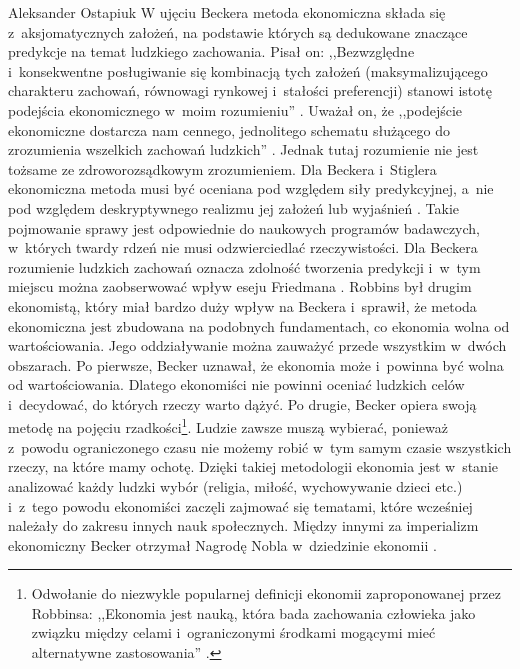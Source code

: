 \begin{artplenv}{Aleksander Ostapiuk}
W ujęciu Beckera metoda ekonomiczna składa się z~aksjomatycznych założeń, na podstawie których są dedukowane znaczące
predykcje na temat ludzkiego zachowania. Pisał on: ,,Bezwzględne i~konsekwentne posługiwanie się kombinacją tych założeń
(maksymalizującego charakteru zachowań, równowagi rynkowej i~stałości preferencji) stanowi istotę podejścia
ekonomicznego w~moim rozumieniu''
\parencite[s.~23]{becker_ekonomiczna_1990}.
Uważał on, że ,,podejście ekonomiczne
dostarcza nam cennego, jednolitego schematu służącego do zrozumienia wszelkich zachowań ludzkich''
\parencite[s.~38]{becker_ekonomiczna_1990}.
Jednak tutaj rozumienie nie jest tożsame ze zdroworozsądkowym
zrozumieniem. Dla Beckera i~Stiglera
\parencite*{becker_gustibus_1977}
ekonomiczna metoda musi być oceniana pod względem
siły predykcyjnej, a~nie pod względem deskryptywnego realizmu jej założeń lub wyjaśnień
\parencite[s.~402–403]{becker_economic_1993}.
Takie pojmowanie sprawy jest odpowiednie do naukowych programów
badawczych, w~których twardy rdzeń nie musi odzwierciedlać rzeczywistości. Dla Beckera rozumienie ludzkich zachowań
oznacza zdolność tworzenia predykcji i~w~tym miejscu można zaobserwować wpływ eseju Friedmana
\parencite*{friedman_essays_1953}.
Robbins był drugim ekonomistą, który miał bardzo duży wpływ na Beckera i~sprawił, że
metoda ekonomiczna jest zbudowana na podobnych fundamentach, co ekonomia wolna od wartościowania. Jego oddziaływanie
można zauważyć przede wszystkim w~dwóch obszarach. Po pierwsze, Becker uznawał, że ekonomia może i~powinna być wolna od
wartościowania. Dlatego ekonomiści nie powinni oceniać ludzkich celów i~decydować, do których rzeczy warto dążyć. Po
drugie, Becker opiera swoją metodę na pojęciu rzadkości\footnote{Odwołanie do niezwykle popularnej definicji ekonomii
zaproponowanej przez Robbinsa: ,,Ekonomia jest nauką, która bada zachowania człowieka jako związku między
celami i~ograniczonymi środkami mogącymi mieć alternatywne zastosowania''
\parencite[s.~15]{robbins_essay_1935}.
}.
Ludzie zawsze muszą wybierać, ponieważ z~powodu ograniczonego czasu nie możemy robić w~tym samym czasie wszystkich rzeczy,
na które mamy ochotę. Dzięki takiej metodologii ekonomia jest w~stanie analizować każdy ludzki wybór (religia, miłość,
wychowywanie dzieci etc.) i~z~tego powodu ekonomiści zaczęli zajmować się tematami, które wcześniej należały
do zakresu innych nauk społecznych. Między innymi za imperializm ekonomiczny Becker otrzymał Nagrodę Nobla w~dziedzinie ekonomii
\parencite[s.~1]{noauthor_royal_1993}.


\end{artplenv}

